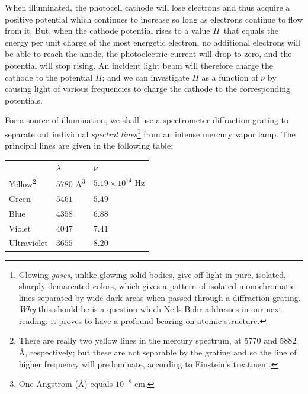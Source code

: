 When illuminated, the photocell cathode will lose electrons and thus
acquire a positive potential which continues to increase so long as
electrons continue to flow from it. But, when the cathode potential
rises to a value $\Pi$~that equals the energy per unit charge of the
most energetic electron, no additional electrons will be able to reach
the anode, the photoelectric current will drop to zero, and the
potential will stop rising. An incident light beam will therefore charge
the cathode to the potential $\Pi$; and we can
investigate $\Pi$ as a function of $\nu$ by causing light of
various frequencies to charge the cathode to the corresponding
potentials.

For a source of illumination, we shall use a spectrometer diffraction
grating to separate out individual \emph{spectral lines}\footnote{Glowing
  \emph{gases}, unlike glowing solid bodies, give off light in pure,
  isolated, sharply-demarcated colors, which gives a pattern of isolated
  monochromatic lines separated by wide dark areas when passed through a
  diffraction grating. \emph{Why} this should be is a question which
  Neils Bohr addresses in our next reading: it proves to have a profound
  bearing on atomic structure.} from an intense mercury vapor lamp. The
principal lines are given in the following table:


\begin{minipage}{0.95\textwidth}
\centering
\begin{tabular}{ l l l }
 & $\lambda$ & $\nu$\\
Yellow\footnote{There are really two yellow lines in the mercury
  spectrum, at 5770 and 5882 Å, respectively; but these are not
  separable by the grating and so the line of higher frequency will
  predominate, according to Einstein's treatment.}
  & $5780$ {\small Å}\footnote{One Angstrom (Å) equals $10^{-8}$ cm.}
  & $5.19\times 10^{14}$ Hz\\

Green & $5461$ & $5.49$\\

Blue & $4358$ & $6.88$\\

Violet & $4047$ &$7.41$\\

Ultraviolet & $3655$ & $8.20$\\

\end{tabular}
\end{minipage}

\medskip

